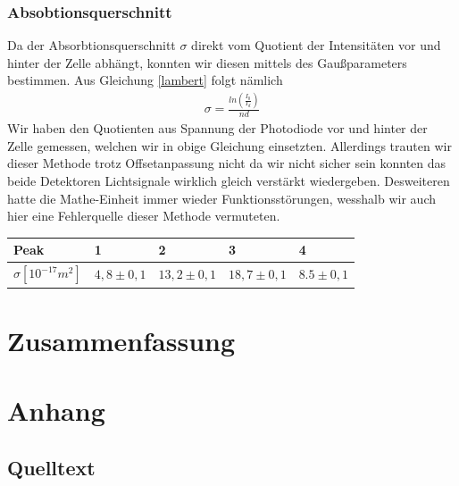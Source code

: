 \documentclass[12pt]{article}
\begin{document}
\subsubsection{Absobtionsquerschnitt}
Da der Absorbtionsquerschnitt $\sigma$ direkt vom Quotient der Intensitäten vor und hinter der Zelle abhängt, konnten wir diesen mittels des Gaußparameters bestimmen. Aus Gleichung \ref{lambert} folgt nämlich
\begin{align*}
 \sigma = \frac{ln \left( \frac{I_0}{I_d} \right) }{nd} 
\end{align*}
Wir haben den Quotienten aus Spannung der Photodiode vor und hinter der Zelle gemessen, welchen wir in obige Gleichung einsetzten. Allerdings trauten wir dieser Methode trotz Offsetanpassung nicht da wir nicht sicher sein konnten das beide Detektoren Lichtsignale wirklich gleich verstärkt wiedergeben. Desweiteren hatte die Mathe-Einheit immer wieder Funktionsstörungen, wesshalb wir auch hier eine Fehlerquelle dieser Methode vermuteten.
\begin{center}
\begin{tabular}{|l|l|l|l|l|}
\hline 
Peak & 1 & 2 & 3 & 4\\
\hline
$\sigma [10^{-17} m^2]$ & $4,8 \pm 0,1$ & $13,2 \pm 0,1$ & $18,7 \pm 0,1$ & $8.5 \pm 0,1$\\
\hline
\end{tabular}
\end{center}

\section{Zusammenfassung}

\section{Anhang}


\subsection{Quelltext}

%
\end{document}
